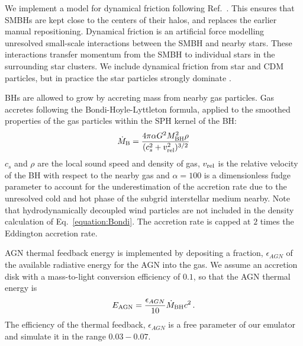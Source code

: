 \documentclass[a4paper,11pt]{article}
\begin{document}
We implement a model for dynamical friction following Ref.~\citep{Chen:2021}. This ensures that SMBHs are kept close to the centers of their halos, and replaces the earlier manual repositioning. Dynamical friction is an artificial force modelling unresolved small-scale interactions between the SMBH and nearby stars. These interactions transfer momentum from the SMBH to individual stars in the surrounding star clusters. We include dynamical friction from star and CDM particles, but in practice the star particles strongly dominate \cite{Chen:2021}.

BHs are allowed to grow by accreting mass from nearby gas particles. Gas accretes following the Bondi-Hoyle-Lyttleton formula, applied to the smoothed properties of the gas particles within the SPH kernel of the BH:
\begin{equation}
\label{equation:Bondi}
    \dot{M}_{\rm B} = \frac{4 \pi \alpha G^2 M_{\rm BH}^2 \rho}{(c^2_s+v_{\rm rel}^2)^{3/2}}
\end{equation}
$c_s$ and $\rho$ are the local sound speed and density of gas, $v_{\rm rel}$ is the relative velocity of the BH with respect to the nearby gas and $\alpha = 100$ is a dimensionless fudge parameter to account for the underestimation of the accretion rate due to the unresolved cold and hot phase of the subgrid interstellar medium nearby.
Note that hydrodynamically decoupled wind particles are not included in the density calculation of Eq.~\ref{equation:Bondi}. The accretion rate is capped at $2$ times the Eddington accretion rate.

AGN thermal feedback energy is implemented by depositing a fraction, $\epsilon_{AGN}$ of the available radiative energy for the AGN into the gas. We assume an accretion disk with a mass-to-light conversion efficiency of $0.1$, so that the AGN thermal energy is \cite{Shakura:1973}
\begin{equation}
\label{equation:Lbol}
    E_\mathrm{AGN} = \frac{\epsilon_{AGN}}{10} \dot{M}_{\rm BH} c^2\,.
\end{equation}
The efficiency of the thermal feedback, $\epsilon_{AGN}$ is a free parameter of our emulator and simulate it in the range $0.03 - 0.07$.
\end{document}
